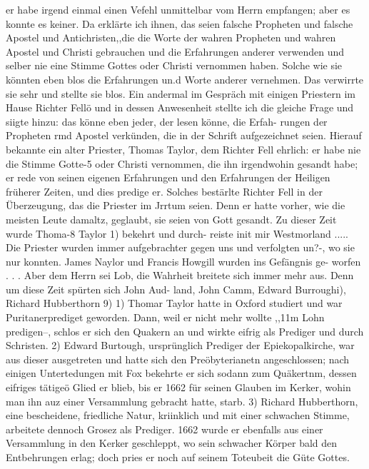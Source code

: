 er habe irgend einmal einen Vefehl unmittelbar vom Herrn
empfangen; aber es konnte es keiner. Da erklärte ich ihnen, das
seien falsche Propheten und falsche Apostel und Antichristen,,die
die Worte der wahren Propheten und wahren Apostel und Christi
gebrauchen und die Erfahrungen anderer verwenden und selber
nie eine Stimme Gottes oder Christi vernommen haben. Solche
wie sie könnten eben blos die Erfahrungen un.d Worte anderer
vernehmen. Das verwirrte sie sehr und stellte sie blos. Ein
andermal im Gespräch mit einigen Priestern im Hause Richter
Fellö und in dessen Anwesenheit stellte ich die gleiche Frage und
siigte hinzu: das könne eben jeder, der lesen könne, die Erfah-
rungen der Propheten rmd Apostel verkünden, die in der Schrift
aufgezeichnet seien. Hierauf bekannte ein alter Priester, Thomas
Taylor, dem Richter Fell ehrlich: er habe nie die Stimme Gotte-5
oder Christi vernommen, die ihn irgendwohin gesandt habe; er
rede von seinen eigenen Erfahrungen und den Erfahrungen der
Heiligen früherer Zeiten, und dies predige er. Solches bestärlte
Richter Fell in der Überzeugung, das die Priester im Jrrtum
seien. Denn er hatte vorher, wie die meisten Leute damaltz,
geglaubt, sie seien von Gott gesandt.
Zu dieser Zeit wurde Thoma-8 Taylor 1) bekehrt und durch-
reiste init mir Westmorland ..... Die Priester wurden immer
aufgebrachter gegen uns und verfolgten un?-, wo sie nur konnten.
James Naylor und Francis Howgill wurden ins Gefängnis ge-
worfen . . . Aber dem Herrn sei Lob, die Wahrheit breitete sich
immer mehr aus. Denn um diese Zeit spürten sich John Aud-
land, John Camm, Edward Burroughi), Richard Hubberthorn 9)
1) Thomar Taylor hatte in Oxford studiert und war Puritanerprediget
geworden. Dann, weil er nicht mehr wollte ,,11m Lohn predigen--, schlos er
sich den Quakern an und wirkte eifrig als Prediger und durch Schristen.
2) Edward Burtough, ursprünglich Prediger der Epiekopalkirche, war
aus dieser ausgetreten und hatte sich den Preöbyterianetn angeschlossen; nach
einigen Untertedungen mit Fox bekehrte er sich sodann zum Quäkertnm, dessen
eifriges tätigeö Glied er blieb, bis er 1662 für seinen Glauben im Kerker, wohin
man ihn auz einer Versammlung gebracht hatte, starb.
3) Richard Hubberthorn, eine bescheidene, friedliche Natur, kriinklich und
mit einer schwachen Stimme, arbeitete dennoch Grosez als Prediger. 1662 wurde
er ebenfalls aus einer Versammlung in den Kerker geschleppt, wo sein schwacher
Körper bald den Entbehrungen erlag; doch pries er noch auf seinem Toteubeit
die Güte Gottes.


